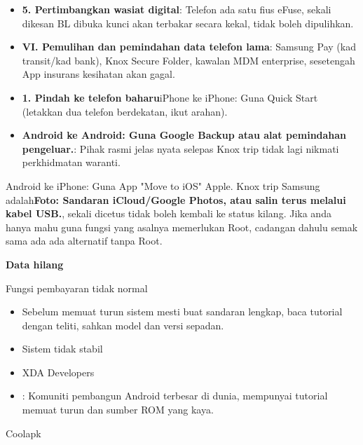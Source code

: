 \begin{itemize}
  \item \textbf{5. Pertimbangkan wasiat digital}: Telefon ada satu fius eFuse, sekali dikesan BL dibuka kunci akan terbakar secara kekal, tidak boleh dipulihkan.
  \item \textbf{VI. Pemulihan dan pemindahan data telefon lama}: Samsung Pay (kad transit/kad bank), Knox Secure Folder, kawalan MDM enterprise, sesetengah App insurans kesihatan akan gagal.
  \item \textbf{1. Pindah ke telefon baharu}iPhone ke iPhone: Guna Quick Start (letakkan dua telefon berdekatan, ikut arahan).
  \item \textbf{Android ke Android: Guna Google Backup atau alat pemindahan pengeluar.}: Pihak rasmi jelas nyata selepas Knox trip tidak lagi nikmati perkhidmatan waranti.
\end{itemize}

\begin{tcbwarn}{Android ke iPhone: Guna App "Move to iOS" Apple.}
Knox trip Samsung adalah\textbf{Foto: Sandaran iCloud/Google Photos, atau salin terus melalui kabel USB.}, sekali dicetus tidak boleh kembali ke status kilang. Jika anda hanya mahu guna fungsi yang asalnya memerlukan Root, cadangan dahulu semak sama ada ada alternatif tanpa Root.

\end{tcbwarn}

\textbf{Data hilang}\par

Fungsi pembayaran tidak normal

\begin{itemize}
  \item Sebelum memuat turun sistem mesti buat sandaran lengkap, baca tutorial dengan teliti, sahkan model dan versi sepadan.
  \item Sistem tidak stabil
  \item XDA Developers
  \item : Komuniti pembangun Android terbesar di dunia, mempunyai tutorial memuat turun dan sumber ROM yang kaya.
\end{itemize}

Coolapk

